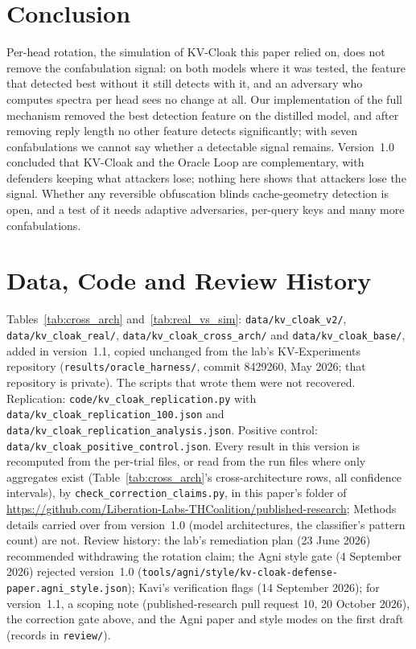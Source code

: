 \section{Conclusion}

Per-head rotation, the simulation of KV-Cloak this paper relied on, does
not remove the confabulation signal: on both models where it was tested,
the feature that detected best without it still detects with it, and an
adversary who computes spectra per head sees no change at all. Our
implementation of the full mechanism removed the best detection feature
on the distilled model, and after removing reply length no other feature
detects significantly; with seven confabulations we cannot say whether a
detectable signal remains. Version~1.0 concluded that KV-Cloak and the
Oracle Loop are complementary, with defenders keeping what attackers lose;
nothing here shows that attackers lose the signal. Whether any reversible
obfuscation blinds cache-geometry detection is open, and a test of it
needs adaptive adversaries, per-query keys and many more confabulations.

\section*{Data, Code and Review History}

{\raggedright
Tables~\ref{tab:cross_arch} and~\ref{tab:real_vs_sim}:
\nolinkurl{data/kv_cloak_v2/}, \nolinkurl{data/kv_cloak_real/},
\nolinkurl{data/kv_cloak_cross_arch/} and \nolinkurl{data/kv_cloak_base/},
added in version~1.1, copied unchanged from the lab's KV-Experiments
repository (\nolinkurl{results/oracle_harness/}, commit 8429260, May 2026;
that repository is private). The scripts that wrote them were not
recovered. Replication: \nolinkurl{code/kv_cloak_replication.py} with
\nolinkurl{data/kv_cloak_replication_100.json} and
\nolinkurl{data/kv_cloak_replication_analysis.json}. Positive control:
\nolinkurl{data/kv_cloak_positive_control.json}. Every result in this
version is recomputed from the per-trial files, or read from the run
files where only aggregates exist (Table~\ref{tab:cross_arch}'s
cross-architecture rows, all confidence intervals), by
\nolinkurl{check_correction_claims.py}, in this paper's folder of
\url{https://github.com/Liberation-Labs-THCoalition/published-research};
Methods details carried over from version~1.0 (model architectures, the
classifier's pattern count) are not.
Review history: the lab's remediation plan (23 June 2026) recommended
withdrawing the rotation claim; the Agni style gate (4 September 2026)
rejected version~1.0
(\nolinkurl{tools/agni/style/kv-cloak-defense-paper.agni_style.json});
Kavi's verification flags (14 September 2026); for version~1.1, a scoping
note (published-research pull request 10, 20 October 2026), the
correction gate above, and the Agni paper and style modes on the first
draft (records in \nolinkurl{review/}).\par}
